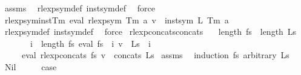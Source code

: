 \begin{isabellebody}
%
\isatagproof
{}\isamarkupfalse%
\ assms\ \isamarkupfalse%
\ rlexp{\isacharunderscore}{\kern0pt}sym{\isacharunderscore}{\kern0pt}def\ inst{\isacharunderscore}{\kern0pt}sym{\isacharunderscore}{\kern0pt}def\ \isamarkupfalse%
\ force%
\endisatagproof
{\isafoldproof}%
%
\isadelimproof
\isanewline
%
\endisadelimproof
\isanewline
{}\isamarkupfalse%
\ rlexp{\isacharunderscore}{\kern0pt}sym{\isacharunderscore}{\kern0pt}inst{\isacharunderscore}{\kern0pt}Tm{\isacharcolon}{\kern0pt}\ {\isachardoublequoteopen}eval\ {\isacharparenleft}{\kern0pt}rlexp{\isacharunderscore}{\kern0pt}sym\ {\isacharparenleft}{\kern0pt}Tm\ a{\isacharparenright}{\kern0pt}{\isacharparenright}{\kern0pt}\ v\ {\isacharequal}{\kern0pt}\ inst{\isacharunderscore}{\kern0pt}sym\ L\ {\isacharparenleft}{\kern0pt}Tm\ a{\isacharparenright}{\kern0pt}{\isachardoublequoteclose}\isanewline
%
\isadelimproof
\ \ %
\endisadelimproof
%
\isatagproof
{}\isamarkupfalse%
\ rlexp{\isacharunderscore}{\kern0pt}sym{\isacharunderscore}{\kern0pt}def\ inst{\isacharunderscore}{\kern0pt}sym{\isacharunderscore}{\kern0pt}def\ \isamarkupfalse%
\ force%
\endisatagproof
{\isafoldproof}%
%
\isadelimproof
\isanewline
%
\endisadelimproof
\isanewline
{}\isamarkupfalse%
\ rlexp{\isacharunderscore}{\kern0pt}concats{\isacharunderscore}{\kern0pt}concats{\isacharcolon}{\kern0pt}\isanewline
\ \ \ {\isachardoublequoteopen}length\ fs\ {\isacharequal}{\kern0pt}\ length\ Ls{\isachardoublequoteclose}\isanewline
\ \ \ \ \ \ \ {\isachardoublequoteopen}{\isasymforall}i\ {\isacharless}{\kern0pt}\ length\ fs{\isachardot}{\kern0pt}\ eval\ {\isacharparenleft}{\kern0pt}fs\ {\isacharbang}{\kern0pt}\ i{\isacharparenright}{\kern0pt}\ v\ {\isacharequal}{\kern0pt}\ Ls\ {\isacharbang}{\kern0pt}\ i{\isachardoublequoteclose}\isanewline
\ \ \ \ \ {\isachardoublequoteopen}eval\ {\isacharparenleft}{\kern0pt}rlexp{\isacharunderscore}{\kern0pt}concats\ fs{\isacharparenright}{\kern0pt}\ v\ {\isacharequal}{\kern0pt}\ concats\ Ls{\isachardoublequoteclose}\isanewline
%
\isadelimproof
%
\endisadelimproof
%
\isatagproof
{}\isamarkupfalse%
\ assms\ \isamarkupfalse%
\ {\isacharparenleft}{\kern0pt}induction\ fs\ arbitrary{\isacharcolon}{\kern0pt}\ Ls{\isacharparenright}{\kern0pt}\isanewline
\ \ \isamarkupfalse%
\ Nil\isanewline
\ \ \isamarkupfalse%
\ \isamarkupfalse%
\ {\isacharquery}{\kern0pt}case\ \isamarkupfalse%

\end{isabellebody}
